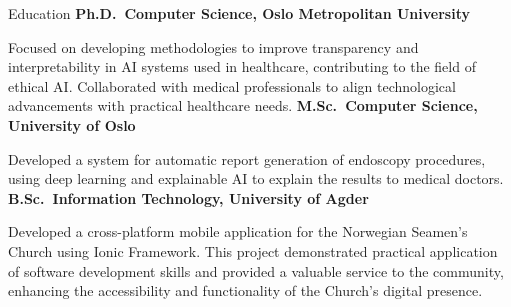 \documentclass[a4paper,skipsamekey,10pt,english]{curve}
\begin{document}
\begin{rubric}{Education}
\entry*[2018 -- 2022]%
\textbf{Ph.D.~Computer Science, Oslo Metropolitan University} \par
Focused on developing methodologies to improve transparency and interpretability in AI systems used in healthcare, contributing to the field of ethical AI.
Collaborated with medical professionals to align technological advancements with practical healthcare needs.
%
\entry*[2016 -- 2018]%
\textbf{M.Sc.~Computer Science, University of Oslo} \par
Developed a system for automatic report generation of endoscopy procedures, using deep learning and explainable AI to explain the results to medical doctors.
% 
\entry*[2012 -- 2015]%
\textbf{B.Sc.~Information Technology, University of Agder} \par
Developed a cross-platform mobile application for the Norwegian Seamen's Church using Ionic Framework. This project demonstrated practical application of software development skills and provided a valuable service to the community, enhancing the accessibility and functionality of the Church's digital presence.
\end{rubric}
\end{document}
